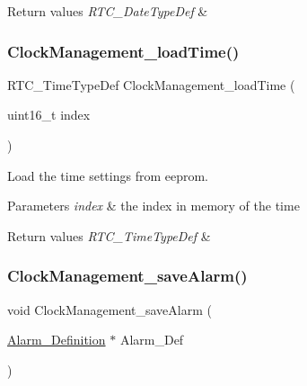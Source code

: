 \begin{DoxyRetVals}{Return values}
{\em R\+T\+C\+\_\+\+Date\+Type\+Def} & \\
\hline
\end{DoxyRetVals}
\mbox{\label{group___clock___management_gab71fe17a64f012980cc619f7d3d55887}} 
\subsubsection{\texorpdfstring{Clock\+Management\+\_\+load\+Time()}{ClockManagement\_loadTime()}}
{\footnotesize\ttfamily R\+T\+C\+\_\+\+Time\+Type\+Def Clock\+Management\+\_\+load\+Time (\begin{DoxyParamCaption}\item[{uint16\+\_\+t}]{index }\end{DoxyParamCaption})}



Load the time settings from eeprom. 


\begin{DoxyParams}{Parameters}
{\em index} & the index in memory of the time \\
\hline
\end{DoxyParams}

\begin{DoxyRetVals}{Return values}
{\em R\+T\+C\+\_\+\+Time\+Type\+Def} & \\
\hline
\end{DoxyRetVals}
\mbox{\label{group___clock___management_ga693a2219ceebdab80e91367b040c751c}} 
\subsubsection{\texorpdfstring{Clock\+Management\+\_\+save\+Alarm()}{ClockManagement\_saveAlarm()}}
{\footnotesize\ttfamily void Clock\+Management\+\_\+save\+Alarm (\begin{DoxyParamCaption}\item[{\hyperlink{struct_alarm___definition}{Alarm\+\_\+\+Definition} $\ast$}]{Alarm\+\_\+\+Def }\end{DoxyParamCaption})}




